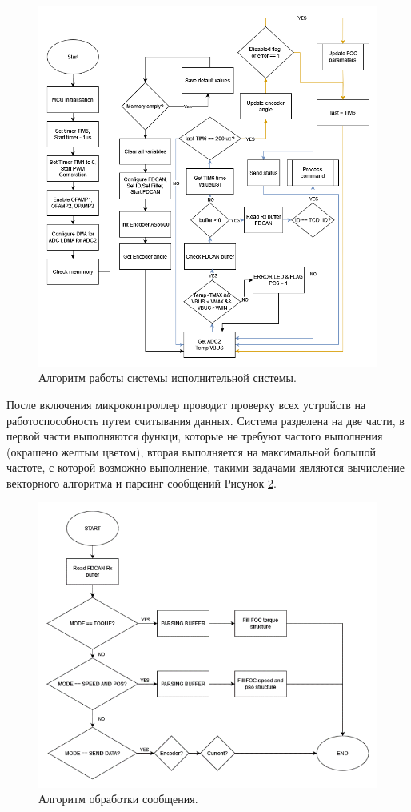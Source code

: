 \begin{figure}[H]
	\centering
	\includegraphics[width=\textwidth]{Src/images/ACD ALG.png}
	\caption{Алгоритм работы системы исполнительной системы.}
	\label{ACDALG}
\end{figure}

После включения микроконтроллер проводит проверку всех устройств на работоспособность путем считывания данных. Система разделена  на две части, в первой части выполняются функци, которые не требуют частого выполнения (окрашено желтым цветом), вторая выполняется на максимальной большой частоте, с которой возможно выполнение, такими задачами являются вычисление векторного алгоритма и парсинг сообщений Рисунок \ref{ACDCMDALG}.

\begin{figure}[H]
	\centering
	\includegraphics[width=\textwidth]{Src/images/ACDCMDALG.png}
	\caption{Алгоритм обработки сообщения.}
	\label{ACDCMDALG}
\end{figure}

